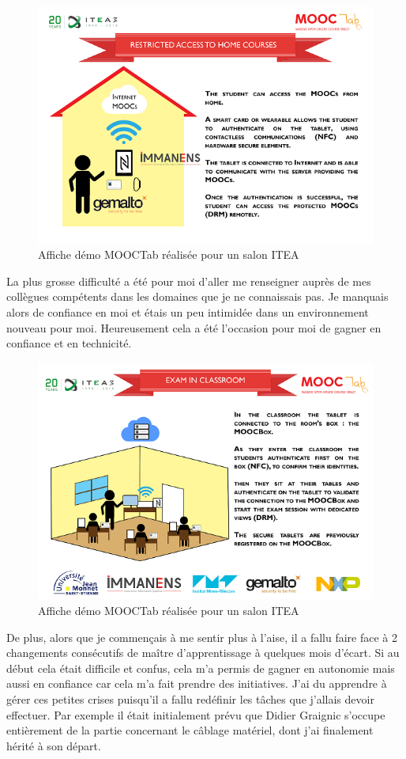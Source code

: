 \documentclass[french,12pt,a4paper,titlepage,openright,openbib]{report}
\begin{document}
\begin{figure}[!htb]
	\centering
	\includegraphics[width=0.8 \textwidth]{home}
	\caption*{Affiche démo MOOCTab réalisée pour un salon ITEA}
\end{figure}

La plus grosse difficulté a été pour moi d'aller me renseigner auprès de mes collègues compétents dans les domaines que je ne connaissais pas. Je manquais alors de confiance en moi et étais un peu intimidée dans un environnement nouveau pour moi. Heureusement cela a été l'occasion pour moi de gagner en confiance et en technicité.

\begin{figure}[!htb]
	\centering
	\includegraphics[width=0.8 \textwidth]{exam}
	\caption*{Affiche démo MOOCTab réalisée pour un salon ITEA}
\end{figure}


De plus, alors que je commençais à me sentir plus à l'aise, il a fallu faire face à 2 changements consécutifs de maître d'apprentissage à quelques mois d'écart. Si au début cela était difficile et confus, cela m'a permis de gagner en autonomie mais aussi en confiance car cela m'a fait prendre des initiatives. J'ai du apprendre à gérer ces petites crises puisqu'il a fallu redéfinir les tâches que j'allais devoir effectuer. Par exemple il était initialement prévu que Didier Graignic s'occupe entièrement de la partie concernant le câblage matériel, dont j'ai finalement hérité à son départ.
\end{document}
